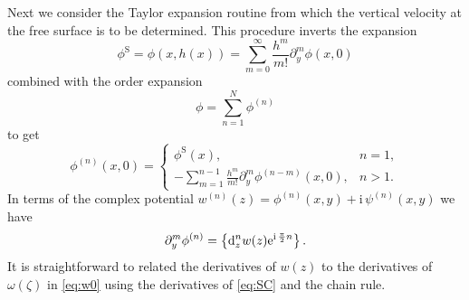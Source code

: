 \documentclass[a4paper,12pt]{article}
\newcommand{\mr}{\mathrm}
\renewcommand{\S}{^\mr{S}}
\newcommand{\ii}{\mr{i}\,}
\newcommand{\ee}{\mr{e}}
\renewcommand{\_}[1]{_\mr{#1}}
\newcommand{\oo}[1]{^{(#1)}}
\let\Re\relax
\DeclareMathOperator\Re{Re}
\newcommand{\w}{w}
\newcommand{\z}{z}
\newcommand{\x}{x}
\newcommand{\y}{y}
\newcommand{\zz}{\zeta}
\newcommand{\ww}{\omega}
\renewcommand{\w}{w}
\begin{document}
Next we consider the Taylor expansion routine from which the vertical velocity at the free surface is to be determined. 
This procedure inverts the expansion 
\[
\phi\S = \phi(x,h(x)) = \sum_{m=0}^\infty \frac{h^m}{m!}\partial_y^m \phi(x,0)
\]
combined with the order expansion 
\begin{equation}
\phi=\sum_{n=1}^N\phi\oo n
\label{eq:phiExpansion}
\end{equation}
to get
\begin{equation}
\phi\oo{n}(x,0) = 
\begin{cases}
\phi\S(x), & n = 1,\\
- \sum_{m=1}^{n-1} \frac{h^m}{m!}\partial_y^m \phi\oo{n-m}(x,0), & n>1.
\end{cases}
\label{eq:phioon}
\end{equation}
In terms of the complex potential $\w\oo n(\z)=\phi\oo n(\x,\y)+\ii \psi\oo n(\x,\y)$ we have 
\begin{equation}
\partial_y^m \phi\oo{n} = \Re\left\{ \mr{d}_\z^n\w(\z) \ee^{\ii \frac\pi2 n} \right\} .
\label{eq:ppphi}
\end{equation}
It is straightforward to related the derivatives of $\w(\z)$ to the derivatives of $\ww(\zz)$ in \eqref{eq:w0} using the derivatives of \eqref{eq:SC} and the chain rule. 
\end{document}
